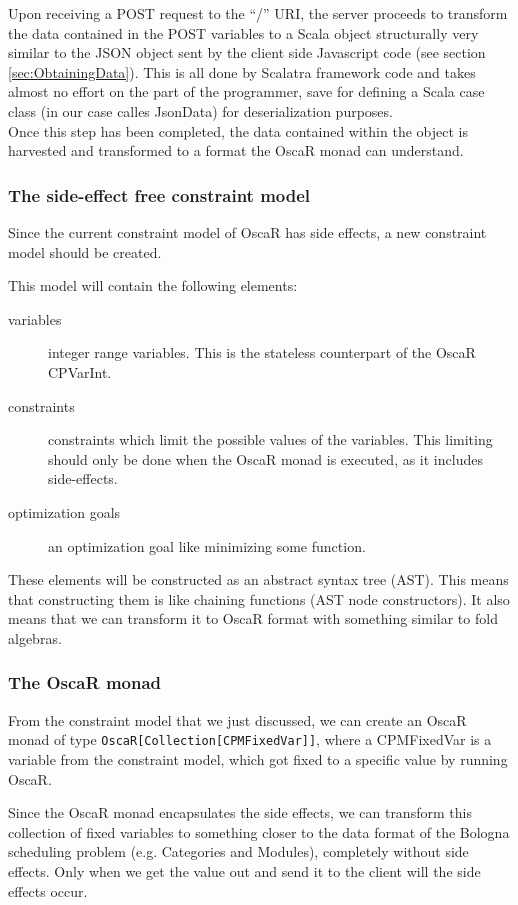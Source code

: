 \documentclass[a4paper]{article}
\begin{document}
Upon receiving a POST request to the ``/'' URI, the server
proceeds to transform the data contained in the POST variables to a
Scala object structurally very similar to the JSON object sent by the
client side Javascript code (see section
\ref{sec:ObtainingData}). This is all done by Scalatra framework code
and takes almost no effort on the part of the programmer, save for
defining a Scala case class (in our case calles JsonData) for
deserialization purposes.\\

Once this step has been completed, the data contained within the
object is harvested and transformed to a format the OscaR monad can
understand.

\subsubsection{The side-effect free constraint model}
Since the current constraint model of OscaR has side effects,
a new constraint model should be created.

This model will contain the following elements:
\begin{description}
	\item[variables] integer range variables.
	This is the stateless counterpart of the OscaR CPVarInt.
	\item[constraints] constraints which limit the possible values of the variables.
	This limiting should only be done when the OscaR monad is executed,
	as it includes side-effects.
	\item[optimization goals] an optimization goal like minimizing some function.
\end{description}
These elements will be constructed as an abstract syntax tree (AST).
This means that constructing them is like chaining functions (AST node constructors). 
It also means that we can transform it to OscaR format with something similar to fold algebras.

\subsubsection{The OscaR monad}
From the constraint model that we just discussed, we can create an OscaR monad of type 
\verb|OscaR[Collection[CPMFixedVar]]|, 
where a CPMFixedVar is a variable from the constraint model, 
which got fixed to a specific value by running OscaR.

Since the OscaR monad encapsulates the side effects,
we can transform this collection of fixed variables to something closer to the
data format of the Bologna scheduling problem (e.g. Categories and Modules),
completely without side effects.
Only when we get the value out and send it to the client will the side effects occur.
\end{document}
